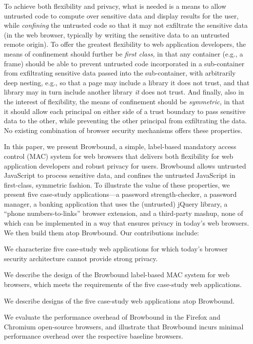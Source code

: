 To achieve both flexibility and privacy, what is needed is a means to
allow untrusted code to compute over sensitive data and display
results for the user, while {\em confining} the untrusted code so that
it may not exfiltrate the sensitive data (in the web browser,
typically by writing the sensitive data to an untrusted remote
origin). To offer the greatest flexibility to web application
developers, the means of confinement should further be {\em first
  class,} in that any container (e.g., a frame) should be able
to prevent untrusted code incorporated in a sub-container from
exfiltrating sensitive data passed into the sub-container, with
arbitrarily deep nesting, e.g., so that a page may include a
library it does not trust, and that library may in turn include
another library {\em it} does not trust. And finally, also in the
interest of flexibility, the means of confinement should be {\em
  symmetric,} in that it should allow each principal on either side of
a trust boundary to pass sensitive data to the other, while preventing
the other principal from exfiltrating the data. No existing
combination of browser security mechanisms offers these properties.

In this paper, we present Browbound, a simple, label-based mandatory
access control (MAC) system for web browsers that delivers both
flexibility for web application developers and robust privacy for
users. Browbound allows untrusted JavaScript to process sensitive
data, and confines the untrusted JavaScript in first-class, symmetric
fashion. To illustrate the value of these properties, we present five
case-study applications---a password strength-checker, a password
manager, a banking application that uses the (untrusted) jQuery
library, a ``phone numbers-to-links'' browser extension, and a
third-party mashup, none of which can be implemented in a way that
ensures privacy in today's web browsers. We then build them atop
Browbound. Our contributions include:

\begin{CompactItemize}
\item We characterize five case-study web applications for which
  today's browser security architecture cannot provide strong privacy.
\item We describe the design of the Browbound label-based MAC system
  for web browsers, which meets the requirements of the five
  case-study web applications.
\item We describe designs of the five case-study web applications atop
  Browbound.
\item We evaluate the performance overhead of Browbound in the Firefox
  and Chromium open-source browsers, and illustrate that Browbound
  incurs minimal performance overhead over the respective baseline
  browsers.
\end{CompactItemize}


